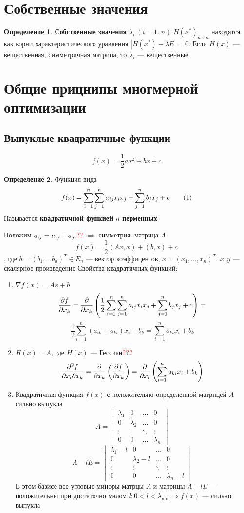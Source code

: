 \documentclass[oneside]{book}
\newcommand\addtag{\refstepcounter{equation}\tag{\theequation}}
\theoremstyle{plain}
\theoremstyle{remark}
\theoremstyle{definition}
\newtheorem*{definition}{Определение}
\begin{document}
\section{Собственные значения}
\label{sec:orga039f0c}
\begin{definition}
\textbf{Собственные значения} \(\lambda_i\ (i = 1..n)\) \(H(x^*)_{n\times n}\) находятся как корни характеристического уравнения \(|H(x^*) - \lambda E| = 0\). Если \(H(x)\) --- вещественная, симметричная матрица, то \(\lambda_i\) --- вещественные
\end{definition}
\section{Общие прицнипы многмерной оптимизации}
\label{sec:org96d7d3b}
\subsection{Выпуклые квадратичные функции}
\label{sec:org32a5679}
\[ f(x) = \frac{1}{2}ax^2 + bx + c \]
\begin{definition}
Функция вида
\[ f(x) = \sum^n_{i = 1}\sum^n_{j = 1}a_{ij}x_ix_j + \sum^n_{j = 1}b_j x_j + c \addtag\label{7_1_quad} \]
Называется \textbf{квадратичной функией \(n\) перменных}
\end{definition}
Положим \(a_{ij} = a_{ij} + a_{ji} {\color{red}??}\) \(\Rightarrow\) симметрия. матрица \(A\)
\[ f(x) = \frac{1}{2}(Ax, x) + (b, x) + c \]
, где \(b = (b_1, \dots b_n)^T \in E_n\) --- вектор коэффицентов, \(x = (x_1, \dots, x_n)^T\). \(x, y\) --- скалярное произведение
Свойства квадратичных функций:
\begin{enumerate}
\item \(\nabla f(x) = Ax + b\)
\[ \frac{\partial f}{\partial x_k} = \frac{\partial }{\partial x_k}\left(\frac{1}{2}\sum^n_{i = 1}\sum^n_{j = 1}a_{ij}x_ix_j + \sum^n_{j = 1}b_j x_j + c\right) = \]
\[ \frac{1}{2}\sum^n_{i = 1}(a_{ik} + a_{ki})x_i + b_k = \sum^n_{i = 1} a_{ki}x_i + b_k \]
\item \(H(x) = A\), где \(H(x)\) --- Гессиан\(\color{red}???\) 
\[ \frac{\partial ^2 f}{\partial x_l \partial x_k} = \frac{\partial }{\partial x_k}\left(\frac{\partial f}{\partial x_k}\right) = \frac{\partial }{\partial x_l}\left(\sum^n_{i = 1} a_{ki} x_i + b_k\right) \]
\item Квадратичная функция \(f(x)\) с положительно определенной матрицей \(A\) сильно выпукла
\[ A = \begin{vmatrix} \lambda_1 & 0 & \dots & 0 \\ 0 & \lambda_2 & \dots & 0 \\ \vdots & \vdots & \ddots & \vdots \\ 0 & 0 & \dots & \lambda_n \end{vmatrix} \]
\[ A - lE = \begin{vmatrix} \lambda_1 - l & 0 & \dots & 0 \\ 0 & \lambda_2 - l & \dots & 0 \\ \vdots & \vdots & \ddots & \vdots \\ 0 & 0 & \dots & \lambda_n - l \end{vmatrix} \]
В этом базисе все угловые миноры матрцы \(A\) и матрицы \(A - lE\) --- положительны при достаточно малом \(l: 0 < l < \lambda_\min \Rightarrow f(x)\) --- сильно выпукла
\end{enumerate}
\end{document}
